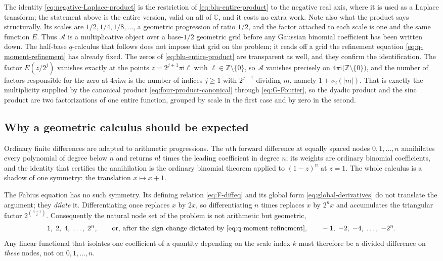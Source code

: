 \documentclass[11pt,oneside]{article}
\theoremstyle{definition}
\theoremstyle{remark}
\newcommand{\C}{\mathbb C}
\newcommand{\Z}{\mathbb Z}
\newcommand{\ii}{\mathrm i}
\newcommand{\vtwo}{v_2}
\begin{document}
The identity \eqref{eq:negative-Laplace-product} is the restriction of
\eqref{eq:blu-entire-product} to the negative real axis, where it is used as a Laplace
transform; the statement above is the entire version, valid on all of $\C$, and it costs no
extra work.  Note also what the product says structurally.  Its scales are
$1/2,1/4,1/8,\ldots$, a geometric progression of ratio $1/2$, and the factor attached to
each scale is one and the same function $E$.  Thus $\mathscr A$ is a multiplicative object
over a base-$1/2$ geometric grid before any Gaussian binomial coefficient has been written
down.  The half-base $q$-calculus that follows does not impose that grid on the problem; it
reads off a grid the refinement equation \eqref{eq:q-moment-refinement} has already fixed.
The zeros of \eqref{eq:blu-entire-product} are transparent as well, and they confirm the
identification.  The factor $E(z/2^j)$ vanishes exactly at the points $z=2^{j+1}\pi\ii\ell$
with $\ell\in\Z\setminus\{0\}$, so $\mathscr A$ vanishes precisely on
$4\pi\ii\bigl(\Z\setminus\{0\}\bigr)$, and the number of factors responsible for the zero at
$4\pi\ii m$ is the number of indices $j\ge1$ with $2^{j-1}$ dividing $m$, namely
$1+\vtwo(|m|)$.  That is exactly the multiplicity supplied by the canonical product
\eqref{eq:four-product-canonical} through \eqref{eq:G-Fourier}, so the dyadic product and
the sinc product are two factorizations of one entire function, grouped by scale in the
first case and by zero in the second.

\subsection{Why a geometric calculus should be expected}
\label{subsec:qs-why-geometric}

Ordinary finite differences are adapted to arithmetic progressions.  The $n$th forward
difference at equally spaced nodes $0,1,\ldots,n$ annihilates every polynomial of degree
below $n$ and returns $n!$ times the leading coefficient in degree $n$; its weights are
ordinary binomial coefficients, and the identity that certifies the annihilation is the
ordinary binomial theorem applied to $(1-z)^n$ at $z=1$.  The whole calculus is a shadow of
one symmetry: the translation $x\mapsto x+1$.

The Fabius equation has no such symmetry.  Its defining relation \eqref{eq:F-diffeq} and its
global form \eqref{eq:global-derivatives} do not translate the argument; they \emph{dilate}
it.  Differentiating once replaces $x$ by $2x$, so differentiating $n$ times replaces $x$ by
$2^nx$ and accumulates the triangular factor $2^{\binom{n+1}{2}}$.  Consequently the natural
node set of the problem is not arithmetic but geometric,
\begin{equation*}
 1,\;2,\;4,\;\ldots,\;2^{n},
 \qquad\text{or, after the sign change dictated by \eqref{eq:q-moment-refinement},}\qquad
 -1,\;-2,\;-4,\;\ldots,\;-2^{n}.
\end{equation*}
Any linear functional that isolates one coefficient of a quantity depending on the scale
index $k$ must therefore be a divided difference on \emph{these} nodes, not on
$0,1,\ldots,n$.
\end{document}

